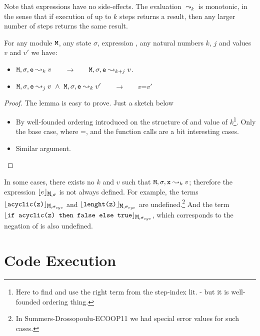 \documentclass[acmsmall,screen]{acmart}
\begin{document}
Note that expressions have no side-effects. The evaluation $\leadsto_k$ is monotonic, in the sense that if execution of up to $k$ steps returns a result, then any larger number of steps returns the same result.

\begin{mylemma}
\label{lemma:expr:eval:monotinic}
For any module ${\mbox{\tt{M}}}$, any state $\sigma$, expression ,  any natural numbers $k$, $j$ and values $v$ and $v'$ we have:
\begin{itemize}
\item
${\mbox{\tt{M}}}, \sigma, {\mbox{\tt{e}}} \leadsto_k v$ \ \ \  $\longrightarrow$ \ \ \  ${\mbox{\tt{M}}}, \sigma, {\mbox{\tt{e}}} \leadsto_{k+j} v$.
\item
$\M, \sigma, \prg{e} \leadsto_j v \ \wedge\ \M, \sigma, \prg{e} \leadsto_k v'$  \ \ \  $\longrightarrow$ \ \ \  $v$=$v'$
\end{itemize}

\end{mylemma}

\begin{proof}
The lemma is easy to prove. Just a sketch below

\begin{itemize}
\item
By well-founded ordering introduced on the structure of  and value of $k$\footnote{Here to find and use the right term from the step-index lit. - but it is well-founded ordering thing.}. Only the base case, where =, and the function calls are  a bit interesting cases.
\item
Similar argument.
\end{itemize}
\end{proof}


 In some cases,  there exists no $k$ and $v$ such that ${\mbox{\tt{M}}}, \sigma, {\mbox{\tt{x}}} \leadsto_k v$; therefore the expression ${\lfloor{ {e}}\rfloor_{{\mbox{\tt{M}}},\sigma}}$ is not always defined. For example,   the terms ${\lfloor{ {{\mbox{\tt{acyclic(z)}}}}}\rfloor_{{\mbox{\tt{M}}},\sigma_{cyc}}}$
and  ${\lfloor{ {{\mbox{\tt{lenght(z)}}}}}\rfloor_{{\mbox{\tt{M}}},\sigma_{cyc}}}$ are undefined.\footnote{In Summers-Drossopoulu-ECOOP11 we had special error values for such cases.} And the term ${\lfloor{ {{\mbox{\tt{if acyclic(z)  then false else true}}}}}\rfloor_{{\mbox{\tt{M}}},\sigma_{cyc}}}$, which corresponds to the negation of  is also undefined.


\section{Code Execution}
\end{document}
